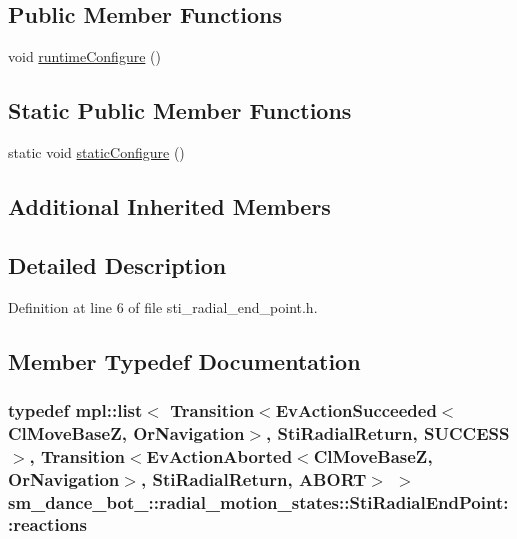 \subsection*{Public Member Functions}
\begin{DoxyCompactItemize}
\item 
void \hyperlink{structsm__dance__bot__2_1_1radial__motion__states_1_1StiRadialEndPoint_a2344eeef3dee9a2b1bb4956e9cbd4639}{runtime\+Configure} ()
\end{DoxyCompactItemize}
\subsection*{Static Public Member Functions}
\begin{DoxyCompactItemize}
\item 
static void \hyperlink{structsm__dance__bot__2_1_1radial__motion__states_1_1StiRadialEndPoint_af1716c7c5ffb71659603d18d9c29bd89}{static\+Configure} ()
\end{DoxyCompactItemize}
\subsection*{Additional Inherited Members}


\subsection{Detailed Description}


Definition at line 6 of file sti\+\_\+radial\+\_\+end\+\_\+point.\+h.



\subsection{Member Typedef Documentation}
\subsubsection[{\texorpdfstring{reactions}{reactions}}]{\setlength{\rightskip}{0pt plus 5cm}typedef mpl\+::list$<$ Transition$<$Ev\+Action\+Succeeded$<${\bf Cl\+Move\+BaseZ}, {\bf Or\+Navigation}$>$, {\bf Sti\+Radial\+Return}, {\bf S\+U\+C\+C\+E\+SS}$>$, Transition$<$Ev\+Action\+Aborted$<${\bf Cl\+Move\+BaseZ}, {\bf Or\+Navigation}$>$, {\bf Sti\+Radial\+Return}, {\bf A\+B\+O\+RT}$>$ $>$ {\bf sm\+\_\+dance\+\_\+bot\+\_\+::radial\+\_\+motion\+\_\+states\+::\+Sti\+Radial\+End\+Point\+::reactions}}\hypertarget{structsm__dance__bot__2_1_1radial__motion__states_1_1StiRadialEndPoint_aaebea73169bfa6a632a0164dd9165376}{}\label{structsm__dance__bot__2_1_1radial__motion__states_1_1StiRadialEndPoint_aaebea73169bfa6a632a0164dd9165376}


